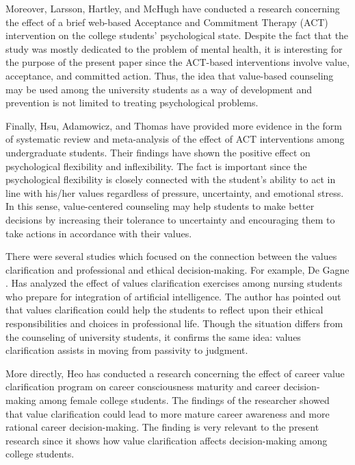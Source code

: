 \documentclass[10pt]{NSP1}
\begin{document}
Moreover, Larsson, Hartley, and McHugh \cite{ref24} have conducted a research concerning the effect of a brief web-based Acceptance and Commitment Therapy (ACT) intervention on the college students' psychological state. Despite the fact that the study was mostly dedicated to the problem of mental health, it is interesting for the purpose of the present paper since the ACT-based interventions involve value, acceptance, and committed action. Thus, the idea that value-based counseling may be used among the university students as a way of development and prevention is not limited to treating psychological problems.

Finally, Hsu, Adamowicz, and Thomas \cite{ref25} have provided more evidence in the form of systematic review and meta-analysis of the effect of ACT interventions among undergraduate students. Their findings have shown the positive effect on psychological flexibility and inflexibility. The fact is important since the psychological flexibility is closely connected with the student's ability to act in line with his/her values regardless of pressure, uncertainty, and emotional stress. In this sense, value-centered counseling may help students to make better decisions by increasing their tolerance to uncertainty and encouraging them to take actions in accordance with their values.

There were several studies which focused on the connection between the values clarification and professional and ethical decision-making. For example, De Gagne \cite{ref26}. Has analyzed the effect of values clarification exercises among nursing students who prepare for integration of artificial intelligence. The author has pointed out that values clarification could help the students to reflect upon their ethical responsibilities and choices in professional life. Though the situation differs from the counseling of university students, it confirms the same idea: values clarification assists in moving from passivity to judgment.

More directly, Heo \cite{ref27} has conducted a research concerning the effect of career value clarification program on career consciousness maturity and career decision-making among female college students. The findings of the researcher showed that value clarification could lead to more mature career awareness and more rational career decision-making. The finding is very relevant to the present research since it shows how value clarification affects decision-making among college students.
\end{document}
